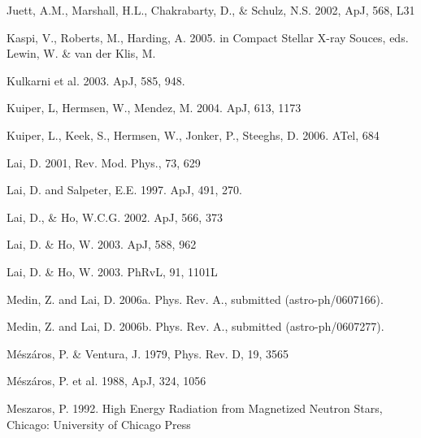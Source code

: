 \documentclass[useAMS,onecolumn,usenatbib,usegraphicx]{mn2e}
\begin{document}
\begin{thebibliography}{}
Juett, A.M., Marshall, H.L., Chakrabarty, D., \& Schulz, N.S. 2002, ApJ,
568, L31

Kaspi, V., Roberts, M., Harding, A. 2005. in Compact Stellar X-ray Souces, 
eds. Lewin, W. \& van der Klis, M.

Kulkarni et al. 2003. ApJ, 585, 948.

Kuiper, L, Hermsen, W., Mendez, M. 2004. ApJ, 613, 1173

Kuiper, L., Keek, S., Hermsen, W., Jonker, P., Steeghs, D. 2006. ATel, 684

Lai, D. 2001, Rev. Mod. Phys., 73, 629

Lai, D. and Salpeter, E.E. 1997. ApJ, 491, 270.

Lai, D., \& Ho, W.C.G. 2002. ApJ, 566, 373

Lai, D. \& Ho, W. 2003. ApJ, 588, 962

Lai, D. \& Ho, W. 2003. PhRvL, 91, 1101L

Medin, Z. and Lai, D. 2006a. Phys. Rev. A., submitted (astro-ph/0607166).

Medin, Z. and Lai, D. 2006b. Phys. Rev. A., submitted (astro-ph/0607277).

M\'{e}sz\'{a}ros, P. \& Ventura, J. 1979, Phys. Rev. D, 19, 3565

M\'{e}sz\'{a}ros, P. et al. 1988, ApJ, 324, 1056

Meszaros, P. 1992. High Energy Radiation from Magnetized Neutron Stars, Chicago: University of Chicago Press


\end{thebibliography}
\end{document}
